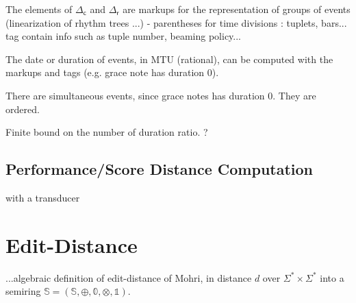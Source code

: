 \documentclass[a4paper,11pt]{article}
\newcommand{\Semiring}{\mathbb{S}}
\newcommand{\zero}{\mathbb{0}}
\newcommand{\one}{\mathbb{1}}
\def\Deltac{{\Delta_\mathsf{c}}}
\def\Deltar{{\Delta_\mathsf{r}}}
\begin{document}
\noindent
The elements of $\Deltac$ and $\Deltar$ are 
markups for the representation of groups of events
(linearization of rhythm trees \cite{jacquemard:hal-01138642}...)
- parentheses for time divisions : tuplets, bars...
tag %
contain info such as tuple number, beaming policy...

\noindent
The date or duration of events, in MTU (rational), 
can be computed with the markups and tags (e.g. grace note has duration 0).

\noindent
There are simultaneous events, since grace notes has duration 0. They are ordered.

\noindent
Finite bound on the number of duration ratio. ?


\subsection{Performance/Score Distance Computation}
with a transducer



%
% 

%






\newpage
\appendix 

\section{Edit-Distance}

...algebraic definition of edit-distance of Mohri, in \cite{Mohri03EDWA}
distance $d$ over $\Sigma^* \times \Sigma^*$ 
into a semiring  $\Semiring = ( \Semiring, \oplus, \zero, \otimes, \one)$.
\end{document}
